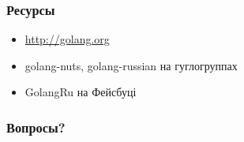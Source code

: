 \documentclass{beamer}
\begin{document}
\begin{frame}
  \frametitle{Ресурсы}
  \begin{itemize}
  \item {\color{blue}\url{http://golang.org}}
  \item golang-nuts, golang-russian на гуглогруппах
  \item GolangRu на Фейсбуці
  \end{itemize}
\end{frame}


\begin{frame}
  \frametitle{Вопросы?}
  \titlepage
\end{frame}
\end{document}
